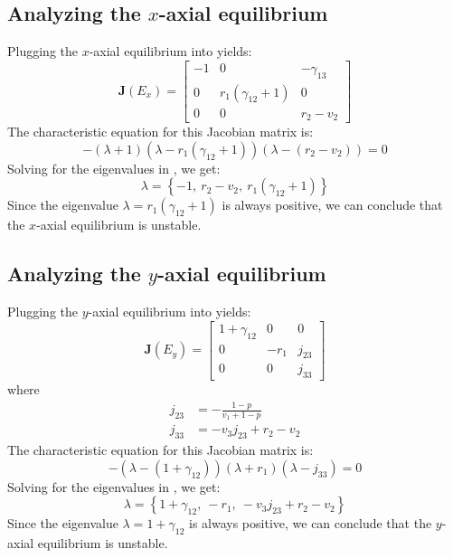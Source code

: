 \subsection{Analyzing the $x$-axial equilibrium}\label{subsec:stability_x_axial_equilibrium}
Plugging the $x$-axial equilibrium into  yields:
\begin{equation}
    \textbf{J}\left(E_x\right)=\begin{bmatrix}
        -1 & 0 & -\gamma_{13}\\
        0 & r_1\left(\gamma_{12}+1\right) & 0\\
        0 & 0 & r_2-v_2
    \end{bmatrix}
    \label{eq:5.4}
\end{equation}
The characteristic equation for this Jacobian matrix is:
\begin{equation}
    -\left(\lambda+1\right)\left(\lambda-r_1\left(\gamma_{12}+1\right)\right)\left(\lambda-\left(r_2-v_2\right)\right)=0
    \label{eq:5.5}
\end{equation}
Solving for the eigenvalues in , we get:
\[
\lambda=\left\{
-1, \
r_2-v_2, \
r_1\left(\gamma_{12}+1\right)
\right\}
\]
Since the eigenvalue $\lambda=r_1\left(\gamma_{12}+1\right)$ is always positive, we can conclude that the $x$-axial equilibrium is unstable.

\subsection{Analyzing the $y$-axial equilibrium}\label{subsec:stability_y_axial_equilibrium}
Plugging the $y$-axial equilibrium into  yields:
\begin{equation}
    \textbf{J}\left(E_y\right)=\begin{bmatrix}
        1+\gamma_{12} & 0 & 0\\
        0 & -r_1 & j_{23}\\
        0 & 0 & j_{33}
    \end{bmatrix}
    \label{eq:5.6}
\end{equation}
where
\begin{align*}
    j_{23} &= -\frac{1-p}{v_1+1-p}\\
    j_{33} &= -v_3j_{23}+r_2-v_2
\end{align*}
The characteristic equation for this Jacobian matrix is:
\begin{equation}
    -\left(\lambda-\left(1+\gamma_{12}\right)\right)\left(\lambda+r_1\right)\left(\lambda-j_{33}\right)=0
    \label{eq:5.7}
\end{equation}
Solving for the eigenvalues in , we get:
\[
\lambda=\left\{
1+\gamma_{12}, \
-r_1, \
-v_3j_{23}+r_2-v_2
\right\}
\]
Since the eigenvalue $\lambda=1+\gamma_{12}$ is always positive, we can conclude that the $y$-axial equilibrium is unstable.

